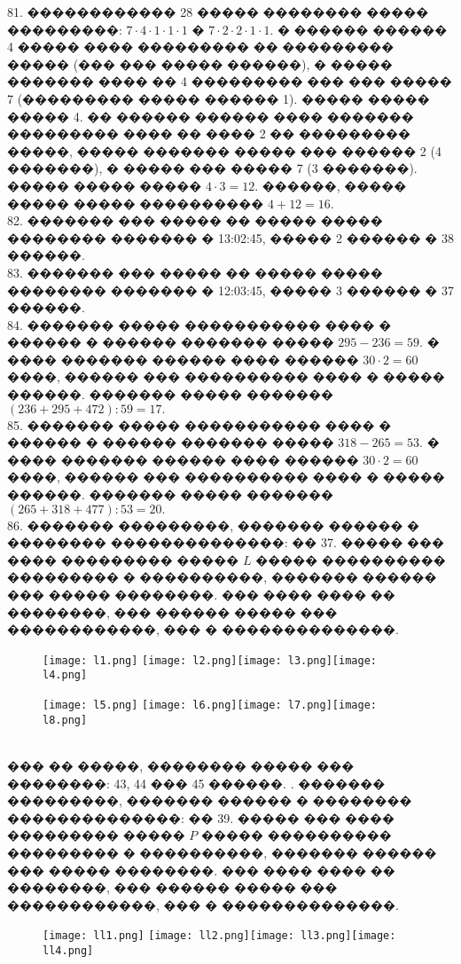 \documentclass[12pt]{article}
\begin{document}
81. ������������ 28 ����� �������� ����� ���������: $7\cdot4\cdot1\cdot1\cdot1$ � $7\cdot2\cdot2\cdot1\cdot1.$ � ������ ������ 4 ����� ���� ��������� �� ��������� ����� (��� ��� ����� ������), � ����� ������� ���� �� 4 ��������� ��� ��� ����� 7 (��������� ����� ������ 1). ����� ����� ����� 4. �� ������ ������ ���� ������� ��������� ���� �� ���� 2 �� ��������� �����, ����� ������� ����� ��� ������ 2 (4 �������), � ����� ��� ����� 7 (3 �������). ����� ����� ����� $4\cdot3=12.$ ������, ����� ����� ����� ���������� $4+12=16.$\\
82. ������� ��� ����� �� ����� ����� �������� ������� � 13:02:45, ����� 2 ������ � 38 ������.\\
83. ������� ��� ����� �� ����� ����� �������� ������� � 12:03:45, ����� 3 ������ � 37 ������.\\
84. ������� ����� ����������� ���� � ������ � ������ ������� ����� $295-236=59.$ � ���� ������� ������ ���� ������ $30\cdot2=60$ ����, ������ ��� ���������� ���� � ����� ������. ������� ����� ������� $(236+295+472):59=17.$\\
85. ������� ����� ����������� ���� � ������ � ������ ������� ����� $318-265=53.$ � ���� ������� ������ ���� ������ $30\cdot2=60$ ����, ������ ��� ���������� ���� � ����� ������. ������� ����� ������� $(265+318+477):53=20.$\\
86. ������� ���������, ������� ������ � �������� ��������������: �� 37. ����� ��� ���� ��������� ����� $L$ ����� ���������� ��������� � ����������, ������� ������ ��� ����� ��������. ��� ���� ���� �� ��������, ��� ������ ����� ��� ������������, ��� � ��������������.
\begin{figure}[ht!]
\texttt{[image: l1.png]} \texttt{[image: l2.png]}\texttt{[image: l3.png]}\texttt{[image: l4.png]}\end{figure}
\begin{figure}[ht!]\texttt{[image: l5.png]} \texttt{[image: l6.png]}\texttt{[image: l7.png]}\texttt{[image: l8.png]}
\end{figure}\\
��� �� �����, �������� ����� ��� ��������: 43, 44 ��� 45 ������.
\newpage{}. ������� ���������, ������� ������ � �������� ��������������: �� 39. ����� ��� ���� ��������� ����� $P$ ����� ���������� ��������� � ����������, ������� ������ ��� ����� ��������. ��� ���� ���� �� ��������, ��� ������ ����� ��� ������������, ��� � ��������������.
\begin{figure}[ht!]
\texttt{[image: ll1.png]} \texttt{[image: ll2.png]}\texttt{[image: ll3.png]}\texttt{[image: ll4.png]}\end{figure}
\end{document}
